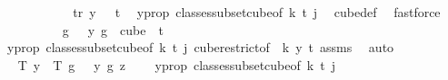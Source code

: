 \begin{isabellebody}
\isanewline
\ \ \ \ \ \ \ \ \isamarkupfalse%
\ \isamarkupfalse%
\ tr{\isacharcolon}{\kern0pt}\ {\isachardoublequoteopen}y\ {}\ {\isacharless}{\kern0pt}\ t{\isachardoublequoteclose}\ \isamarkupfalse%
\ y{\isacharunderscore}{\kern0pt}prop\ classes{\isacharunderscore}{\kern0pt}subset{\isacharunderscore}{\kern0pt}cube{\isacharbrackleft}{\kern0pt}of\ {\isachardoublequoteopen}k{\isacharplus}{\kern0pt}{}{\isachardoublequoteclose}\ t\ j{\isacharbrackright}{\kern0pt}\ \isamarkupfalse%
\ cube{\isacharunderscore}{\kern0pt}def\ \isamarkupfalse%
\ fastforce\isanewline
\isanewline
\ \ \ \ \ \ \ \ \isamarkupfalse%
\ {\isachardoublequoteopen}{\isacharparenleft}{\kern0pt}{\isasymlambda}g\ {\isasymin}\ {\isacharbraceleft}{\kern0pt}{\isachardot}{\kern0pt}{\isachardot}{\kern0pt}{\isacharless}{\kern0pt}{}{\isacharbraceright}{\kern0pt}{\isachardot}{\kern0pt}\ y\ g{\isacharparenright}{\kern0pt}\ {\isasymin}\ cube\ {}\ {\isacharparenleft}{\kern0pt}t{\isacharplus}{\kern0pt}{}{\isacharparenright}{\kern0pt}{\isachardoublequoteclose}\ \isamarkupfalse%
\ y{\isacharunderscore}{\kern0pt}prop\ classes{\isacharunderscore}{\kern0pt}subset{\isacharunderscore}{\kern0pt}cube{\isacharbrackleft}{\kern0pt}of\ {\isachardoublequoteopen}k{\isacharplus}{\kern0pt}{}{\isachardoublequoteclose}\ t\ j{\isacharbrackright}{\kern0pt}\ cube{\isacharunderscore}{\kern0pt}restrict{\isacharbrackleft}{\kern0pt}of\ {}\ {\isachardoublequoteopen}{\isacharparenleft}{\kern0pt}k{\isacharplus}{\kern0pt}{}{\isacharparenright}{\kern0pt}{\isachardoublequoteclose}\ y\ {\isachardoublequoteopen}t{\isacharplus}{\kern0pt}{}{\isachardoublequoteclose}{\isacharbrackright}{\kern0pt}\ assms{\isacharparenleft}{\kern0pt}{}{\isacharparenright}{\kern0pt}\ \isamarkupfalse%
\ auto\isanewline
\ \ \ \ \ \ \ \ \isamarkupfalse%
\ \isamarkupfalse%
\ {\isachardoublequoteopen}T\ y\ {\isacharequal}{\kern0pt}\ T{\isacharprime}{\kern0pt}\ {\isacharparenleft}{\kern0pt}{\isasymlambda}g\ {\isasymin}\ {\isacharbraceleft}{\kern0pt}{\isachardot}{\kern0pt}{\isachardot}{\kern0pt}{\isacharless}{\kern0pt}{}{\isacharbraceright}{\kern0pt}{\isachardot}{\kern0pt}\ y\ g{\isacharparenright}{\kern0pt}\ z\ \ {\isachardoublequoteclose}\ \isamarkupfalse%
\ y{\isacharunderscore}{\kern0pt}prop\ classes{\isacharunderscore}{\kern0pt}subset{\isacharunderscore}{\kern0pt}cube{\isacharbrackleft}{\kern0pt}of\ {\isachardoublequoteopen}k{\isacharplus}{\kern0pt}{}{\isachardoublequoteclose}\ t\ j{\isacharbrackright}{\kern0pt}\ \isamarkupfalse%

\end{isabellebody}
